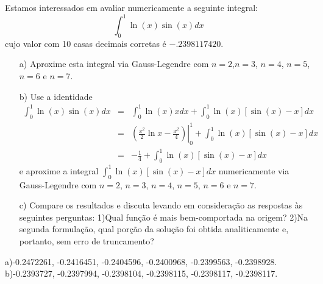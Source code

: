 \begin{Exercise}Estamos interessados em avaliar numericamente a seguinte integral:
$$\int_0^1 \ln(x)\sin(x)dx$$
cujo valor com 10 casas decimais corretas é $-.2398117420$.
\begin{itemize}
\item[a)] Aproxime esta integral via Gauss-Legendre com $n=2$,$n=3$, $n=4$, $n=5$, $n=6$ e $n=7$.
\item[b)] Use a identidade
\begin{eqnarray*}
\int_0^1 \ln(x)\sin(x)dx&=&\int_0^1 \ln(x)xdx+\int_0^1 \ln(x)\left[\sin(x)-x\right]dx\\
&=&\left.\left(\frac{x^2}{2}\ln x-\frac{x^2}{4}\right)\right|_0^1+\int_0^1 \ln(x)\left[\sin(x)-x\right]dx\\
&=&-\frac{1}{4}+\int_0^1 \ln(x)\left[\sin(x)-x\right]dx
\end{eqnarray*}
e aproxime a integral $\int_0^1 \ln(x)\left[\sin(x)-x\right]dx$ numericamente via Gauss-Legendre com $n=2$, $n=3$, $n=4$, $n=5$, $n=6$ e $n=7$.
\item[c)] Compare os resultados e discuta levando em consideração as respostas às seguintes perguntas: 1)Qual função é mais bem-comportada na origem? 2)Na segunda formulação, qual porção da solução foi obtida analiticamente e, portanto, sem erro de truncamento?
\end{itemize}
\end{Exercise}

\begin{Answer}
  \begin{tiny}
 a)-0.2472261,  -0.2416451,  -0.2404596,  -0.2400968,  -0.2399563,  -0.2398928.
 b)-0.2393727,  -0.2397994,  -0.2398104,  -0.2398115,  -0.2398117,  -0.2398117.  
  \end{tiny}
\end{Answer}


